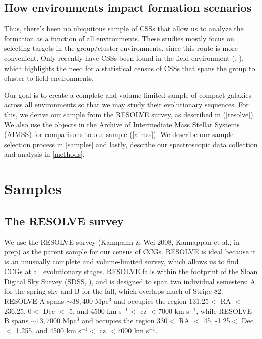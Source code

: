 \documentclass[iop,apj,twocolappendix]{emulateapj}
\begin{document}
\subsection{How environments impact formation scenarios}
Thus, there's been no ubiquitous sample of CSSs that allow us to analyze the formation as a function of all environments. These studies mostly focus on selecting targets in the group/cluster environments, since this route is more convenient. Only recently have CSSs been found in the field environment (\citet{Huxor2013}, \citet{Chilingarian2015}), which highlights the need for a statistical census of CSSs that spans the group to cluster to field environments. 

\noindent Our goal is to create a complete and volume-limited sample of compact galaxies across all environments so that we may study their evolutionary sequences. For this, we derive our sample from the RESOLVE survey, as described in (\autoref{resolve}). We also use the objects in the Archive of Intermediate Mass Stellar Systems (AIMSS) for comparisons to our sample (\autoref{aimss}). We describe our sample selection process in \autoref{samples} and lastly, describe our spectroscopic data collection and analysis in \autoref{methods}.

\section{Samples}
\label{samples}

\subsection{The RESOLVE survey}
\label{resolve}

\noindent We use the RESOLVE survey (Kannpann \& Wei 2008, Kannappan et al., in prep) as the parent sample for our census of CCGs. RESOLVE is ideal because it is an unusually complete and volume-limited survey, which allows us to find CCGs at all evolutionary stages. RESOLVE falls within the footprint of the Sloan Digital Sky Survey (SDSS, \citet{York2000}), and is designed to span two individual semesters: A for the spring sky and B for the fall, which overlaps much of Stripe-82. RESOLVE-A spans $\sim38,400$ Mpc$^3$ and occupies the region 131.25\textdegree $<$ RA $<$ 236.25\textdegree, 0\textdegree $<$ Dec $<$ 5\textdegree, and 4500 km s$^{-1} <$ cz $< 7000$ km s$^{-1}$, while RESOLVE-B spans $\sim13,7000 $ Mpc$^3$ and occupies the region 330\textdegree $<$ RA $<$ 45\textdegree, -1.25\textdegree $<$ Dec $<$ 1.255\textdegree, and 4500 km s$^{-1} <$ cz $< 7000$ km s$^{-1}$.
\end{document}
